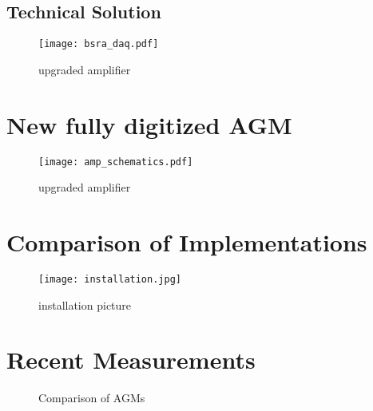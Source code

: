 \subsection{Technical Solution}

        \begin{figure}[!tbh]
            \centering
            \texttt{[image: bsra\_daq.pdf]}
            \caption{upgraded amplifier}
            \label{fig:amplifier}
        \end{figure}


\section{New fully digitized AGM}

        \begin{figure}[!tbh]
            \centering
            \texttt{[image: amp\_schematics.pdf]}
            \caption{upgraded amplifier}
            \label{fig:amplifier}
        \end{figure}

\section{Comparison of Implementations}

        \begin{figure}[!tbh]
            \centering
            \texttt{[image: installation.jpg]}
            \caption{installation picture}
            \label{fig:amplifier}
        \end{figure}

\section{Recent Measurements}

    \begin{figure}[!htb]
      \begin{center}
          \scalebox{0.54}{}
          \caption{Comparison of AGMs}
          \label{fig:comparison_chart}
      \end{center}
    \end{figure}

